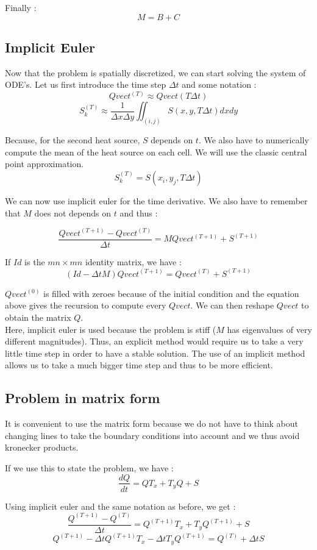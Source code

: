 Finally : 
$$M = B + C$$

\subsection{Implicit Euler}

Now that the problem is spatially discretized, we can start solving the system of ODE's. Let us first introduce the time step $\Delta t$ and some notation :
$$Qvect^{(T)} \approx Qvect(T\Delta t)$$
$$S_k^{(T)} \approx \frac{1}{\Delta x \Delta y}\iint_{(i,j)} S(x,y,T\Delta t)dxdy$$

Because, for the second heat source, $S$ depends on $t$. We also have to numerically compute the mean of the heat source on each cell. We will use the classic central point approximation. 
$$S_k^{(T)} = S(x_i,y_j,T\Delta t)$$

We can now use implicit euler for the time derivative. We also have to remember that $M$ does not depends on $t$ and thus :

$$\frac{Qvect^{(T+1)}-Qvect^{(T)}}{\Delta t} = MQvect^{(T+1)} + S^{(T+1)}$$

If $Id$ is the $mn\times mn$ identity matrix, we have :
$$(Id-\Delta t M)Qvect^{(T+1)} = Qvect^{(T)} + S^{(T+1)}$$

$Qvect^{(0)}$ is filled with zeroes because of the initial condition and the equation above gives the recursion to compute every $Qvect$. We can then reshape $Qvect$ to obtain the matrix $Q$. \\


Here, implicit euler is used because the problem is stiff ($M$ has eigenvalues of very different magnitudes). Thus, an explicit method would require us to take a very little time step in order to have a stable solution. The use of an implicit method allows us to take a much bigger time step and thus to be more efficient.

\subsection{Problem in matrix form}
It is convenient to use the matrix form because we do not have to think about changing lines to take the boundary conditions into account and we thus avoid kronecker products.

If we use this to state the problem, we have : 
$$\frac{dQ}{dt}=QT_x+T_yQ+S$$

Using implicit euler and the same notation as before, we get :
$$\frac{Q^{(T+1)}-Q^{(T)}}{\Delta t} = Q^{(T+1)}T_x+T_yQ^{(T+1)}+S$$
$$Q^{(T+1)} - \Delta t Q^{(T+1)}T_x - \Delta t T_yQ^{(T+1)} = Q^{(T)}+\Delta t S$$

